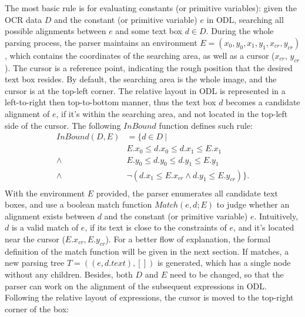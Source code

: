 The most basic rule is for evaluating constants (or primitive variables):
given the OCR data $D$ and the constant (or primitive variable) $e$ in ODL,
searching all possible alignments between $e$ and some text box $d \in D$.
During the whole parsing process, the parser maintains an environment
$E = (x_0, y_0, x_1, y_1, x_{cr}, y_{cr})$,
which contains the coordinates of the searching area,
as well as a cursor ($x_{cr}$, $y_{cr}$).
The cursor is a reference point, indicating the rough position
that the desired text box resides.
By default, the searching area is the whole image,
and the cursor is at the top-left corner.
The relative layout in ODL is represented in a
left-to-right then top-to-bottom manner,
thus the text box $d$ becomes a candidate alignment of $e$,
if it's within the searching area,
and not located in the top-left side of the cursor.
The following $InBound$ function defines such rule:
\begin{equation}
  \begin{aligned}
      InBound(D, E) & = \{d \in D\ |\ \\
      & E.x_0 \leq d.x_0 \leq d.x_1 \leq E.x_1 \\
      \land &
      E.y_0 \leq d.y_0 \leq d.y_1 \leq E.y_1 \\
      \land & \lnot
      ( d.x_1 \leq E.x_{cr} \land d.y_1 \leq E.y_{cr} )
      \}. \\
  \end{aligned}
\end{equation}
With the environment $E$ provided,
the parser enumerates all candidate text boxes,
and use a boolean match function $Match(e, d; E)$ to
judge whether an alignment exists between $d$ and
the constant (or primitive variable) $e$.
Intuitively, $d$ is a valid match of $e$,
if its text is close to the constraints of $e$,
and it's located near the cursor ($E.x_{cr}, E.y_{cr}$).
For a better flow of explanation, the formal definition of the match function
will be given in the next section.
If matches, a new parsing tree $T=((e, d.text), [])$ is generated,
which has a single node without any children.
Besides, both $D$ and $E$ need to be changed, so that the parser
can work on the alignment of the subsequent expressions in ODL.
Following the relative layout of expressions,
the cursor is moved to the top-right corner of the box:
